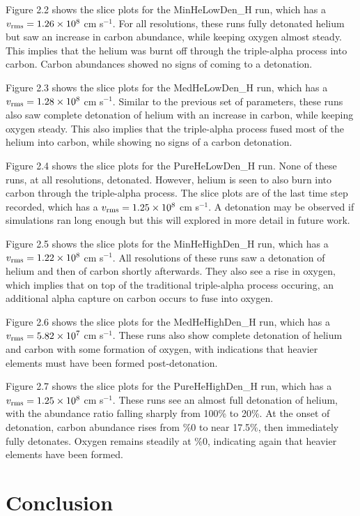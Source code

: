 Figure 2.2 shows the slice plots for the MinHeLowDen\_H run, which has a $v_{\rm rms} = 1.26 \times 10^8$ cm s$^{-1}$. For all resolutions, these runs fully detonated helium but saw an increase in carbon abundance, while keeping oxygen almost steady. This implies that the helium was burnt off through the triple-alpha process into carbon. Carbon abundances showed no signs of coming to a detonation.

Figure 2.3 shows the slice plots for the MedHeLowDen\_H run, which has a $v_{\rm rms} = 1.28 \times 10^8$ cm s$^{-1}$. Similar to the previous set of parameters, these runs also saw complete detonation of helium with an increase in carbon, while keeping oxygen steady. This also implies that the triple-alpha process fused most of the helium into carbon, while showing no signs of a carbon detonation.

Figure 2.4 shows the slice plots for the PureHeLowDen\_H run. None of these runs, at all resolutions, detonated. However, helium is seen to also burn into carbon through the triple-alpha process. The slice plots are of the last time step recorded, which has a $v_{\rm rms} = 1.25 \times 10^8$ cm s$^{-1}$. A detonation may be observed if simulations ran long enough but this will explored in more detail in future work.

Figure 2.5 shows the slice plots for the MinHeHighDen\_H run, which has a $v_{\rm rms} = 1.22 \times 10^8$ cm s$^{-1}$. All resolutions of these runs saw a detonation of helium and then of carbon shortly afterwards. They also see a rise in oxygen, which implies that on top of the traditional triple-alpha process occuring, an additional alpha capture on carbon occurs to fuse into oxygen.

Figure 2.6 shows the slice plots for the MedHeHighDen\_H run, which has a $v_{\rm rms} = 5.82 \times 10^7$ cm s$^{-1}$. These runs also show complete detonation of helium and carbon with some formation of oxygen, with indications that heavier elements must have been formed post-detonation.

Figure 2.7 shows the slice plots for the PureHeHighDen\_H run, which has a $v_{\rm rms} = 1.25 \times 10^8$ cm s$^{-1}$. These runs see an almost full detonation of helium, with the abundance ratio falling sharply from 100\% to 20\%. At the onset of detonation, carbon abundance rises from \%0 to near 17.5\%, then immediately fully detonates. Oxygen remains steadily at \%0, indicating again that heavier elements have been formed.

\section{Conclusion}

